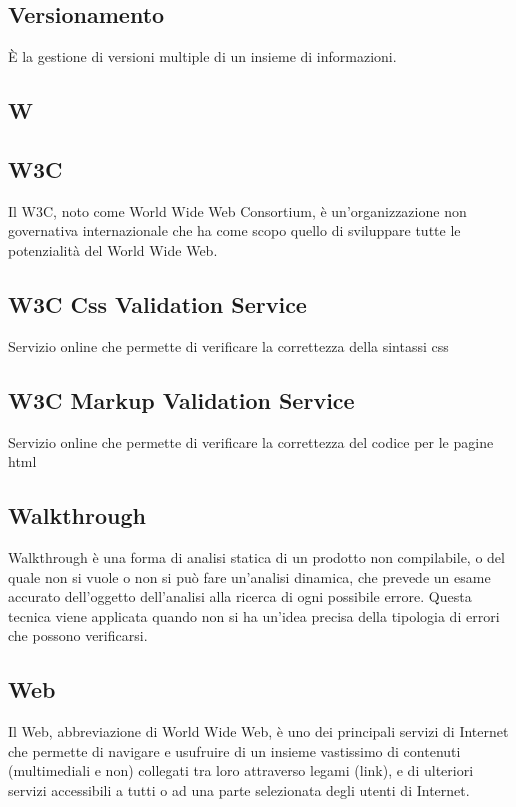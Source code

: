 \subsection{Versionamento}
È la gestione di versioni multiple di un insieme di informazioni.

\newpage

\begin{center}
\Huge\section{\uppercase{W}}
\end{center}

\subsection{W3C}
Il W3C, noto come World Wide Web Consortium, è un'organizzazione non governativa internazionale che ha come scopo quello di sviluppare tutte le potenzialità del World Wide Web.

\subsection{W3C Css Validation Service}
Servizio online che permette di verificare la correttezza della sintassi css

\subsection{W3C Markup Validation Service}
Servizio online che permette di verificare
la correttezza del codice per le pagine html

\subsection{Walkthrough }
Walkthrough è una forma di analisi statica di un prodotto non compilabile, o del
quale non si vuole o non si può fare un'analisi dinamica, che prevede un esame accurato
dell'oggetto dell'analisi alla ricerca di ogni possibile errore. Questa tecnica viene applicata
quando non si ha un'idea precisa della tipologia di errori che possono verificarsi.

\subsection{Web}
Il Web, abbreviazione di World Wide Web, è uno dei principali servizi di Internet che permette di navigare e usufruire di un insieme vastissimo di contenuti (multimediali e non) collegati tra loro attraverso legami (link), e di ulteriori servizi accessibili a tutti o ad una parte selezionata degli utenti di Internet.

